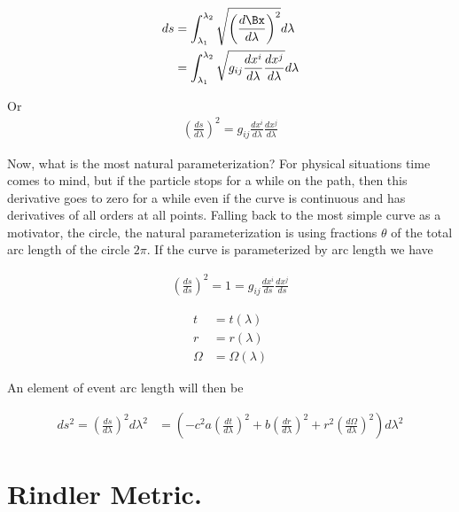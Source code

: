 \documentclass{article}      %
\newcommand{\CC}[0]{c^2}
\begin{document}
\begin{align*}
ds
&= \int_{\lambda_1}^{\lambda_2} \sqrt{\left(\frac{d\Bx}{d\lambda}\right)^2} d\lambda \\
&= \int_{\lambda_1}^{\lambda_2} \sqrt{ g_{ i j } \frac{dx^i}{d\lambda} \frac{dx^j}{d\lambda} } d\lambda \\
\end{align*}

Or
\begin{align*}
\left(\frac{ds}{d\lambda}\right)^2 = g_{ i j } \frac{dx^i}{d\lambda} \frac{dx^j}{d\lambda}
\end{align*}

Now, what is the most natural parameterization?  For physical situations time comes to mind, but if the particle stops for a
while on the path, then this derivative goes to zero for a while even if the curve is continuous and has derivatives of all
orders at all points.  Falling back to the most simple curve as a motivator, the circle, 
the natural parameterization is using fractions $\theta$ of the total arc length of the circle $2\pi$.  If the
curve is parameterized by arc length we have

\begin{align*}
\left(\frac{ds}{ds}\right)^2 = 1 = g_{ i j } \frac{dx^i}{ds} \frac{dx^j}{ds}
\end{align*}



\begin{align*}
t &= t(\lambda) \\
r &= r(\lambda) \\
\Omega &= \Omega(\lambda)
\end{align*}

An element of event arc length will then be

\begin{align*}
ds^2 = \left(\frac{ds}{d\lambda}\right)^2 {d\lambda}^2
&=
\left( -\CC a \left(\frac{dt}{d\lambda}\right)^2 + {b} \left(\frac{dr}{d\lambda}\right)^2 + r^2\left(\frac{d\Omega}{d\lambda}\right)^2 \right) {d\lambda}^2
\end{align*}


\section{ Rindler Metric. }
\end{document}
